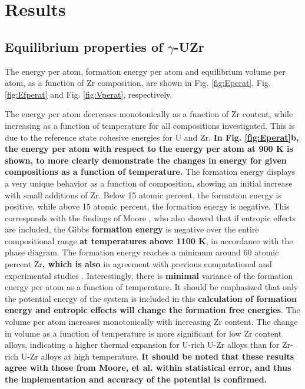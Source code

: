\documentclass[review]{elsarticle}
\providecommand{\DIFaddtex}[1]{{\bf #1}} %
\providecommand{\DIFdeltex}[1]{} %
\providecommand{\DIFaddbegin}{\protect\color{blue}} %
\providecommand{\DIFaddend}{\protect\color{black}} %
\providecommand{\DIFdelbegin}{\protect\color{red}} %
\providecommand{\DIFdelend}{\protect\color{black}} %
\providecommand{\DIFadd}[1]{\texorpdfstring{\DIFaddtex{#1}}{#1}} %
\providecommand{\DIFdel}[1]{\texorpdfstring{\DIFdeltex{#1}}{}} %
\newcommand{\DIFscaledelfig}{0.5}
\newlength{\DIFdelgraphicswidth} %
\newlength{\DIFdelgraphicsheight} %
\newcommand{\DIFaddincludegraphics}[2][]{{\color{blue}\fbox{\DIFOincludegraphics[#1]{#2}}}} %
\newcommand{\DIFdelincludegraphics}[2][]{%
\sbox{\DIFdelgraphicsbox}{\DIFOincludegraphics[#1]{#2}}%
\settoboxwidth{\DIFdelgraphicswidth}{\DIFdelgraphicsbox} %
\settoboxtotalheight{\DIFdelgraphicsheight}{\DIFdelgraphicsbox} %
\scalebox{\DIFscaledelfig}{%
\parbox[b]{\DIFdelgraphicswidth}{\usebox{\DIFdelgraphicsbox}\\[-\baselineskip] \rule{\DIFdelgraphicswidth}{0em}}\llap{\resizebox{\DIFdelgraphicswidth}{\DIFdelgraphicsheight}{%
\setlength{\unitlength}{\DIFdelgraphicswidth}%
\begin{picture}(1,1)%
\thicklines\linethickness{2pt} %
{\color[rgb]{1,0,0}\put(0,0){\framebox(1,1){}}}%
{\color[rgb]{1,0,0}\put(0,0){\line( 1,1){1}}}%
{\color[rgb]{1,0,0}\put(0,1){\line(1,-1){1}}}%
\end{picture}%
}\hspace*{3pt}}} %
} %
\DeclareRobustCommand{\DIFaddbegin}{\DIFOaddbegin \let\includegraphics\DIFaddincludegraphics} %
\DeclareRobustCommand{\DIFaddend}{\DIFOaddend \let\includegraphics\DIFOincludegraphics} %
\DeclareRobustCommand{\DIFdelbegin}{\DIFOdelbegin \let\includegraphics\DIFdelincludegraphics} %
\DeclareRobustCommand{\DIFdelend}{\DIFOaddend \let\includegraphics\DIFOincludegraphics} %
\begin{document}
\section{Results}
\subsection{Equilibrium properties of $\gamma$-UZr}\label{sec:res1}

The energy per atom, formation energy per atom and equilibrium volume per atom, as a function of Zr composition, are shown in Fig. \ref{fig:Eperat}, Fig. \ref{fig:Efperat} and Fig. \ref{fig:Vperat}, respectively. \DIFdelbegin %

\DIFdelend The energy per atom decreases monotonically as a function of Zr content, while increasing as a function of temperature for all compositions investigated. This is due to the reference state cohesive energies for U and Zr. \DIFaddbegin \DIFadd{In Fig. \ref{fig:Eperat}b, the energy per atom with respect to the energy per atom at 900 K is shown, to more clearly demonstrate the changes in energy for given compositions as a function of temperature. }\DIFaddend The formation energy displays a very unique behavior as a function of composition, showing an initial increase with small additions of Zr. Below 15 atomic percent, the formation energy is positive, while above 15 atomic percent, the formation energy is negative. This corresponds with the findings of Moore \cite{moore2015}, who also showed that if entropic effects are included, the Gibbs \DIFdelbegin \DIFdel{Formation Energy }\DIFdelend \DIFaddbegin \DIFadd{formation energy }\DIFaddend is negative over the entire compositional range \DIFaddbegin \DIFadd{at temperatures above 1100 K}\DIFaddend , in accordance with the phase diagram. The formation energy reaches a minimum around 60 atomic percent Zr\DIFdelbegin \DIFdel{. This is }\DIFdelend \DIFaddbegin \DIFadd{, which is also }\DIFaddend in agreement with previous computational and experimental studies \cite{moore2015}. Interestingly, there is \DIFdelbegin \DIFdel{effectively no }\DIFdelend \DIFaddbegin \DIFadd{minimal }\DIFaddend variance of the formation energy per atom as a function of temperature. It should be emphasized that only the potential energy of the system is included in this \DIFdelbegin \DIFdel{investigation}\DIFdelend \DIFaddbegin \DIFadd{calculation of formation energy and entropic effects will change the formation free energies}\DIFaddend . The volume per atom increases monotonically with increasing Zr content. The change in volume as a function of temperature is more significant for low Zr content alloys, indicating a higher thermal expansion for U-rich U-Zr alloys than for Zr-rich U-Zr alloys at high temperature. \DIFaddbegin \DIFadd{It should be noted that these results agree with those from Moore, et al.  \cite{moore2015} within statistical error, and thus the implementation and accuracy of the potential is confirmed.
}\DIFaddend 
\end{document}
